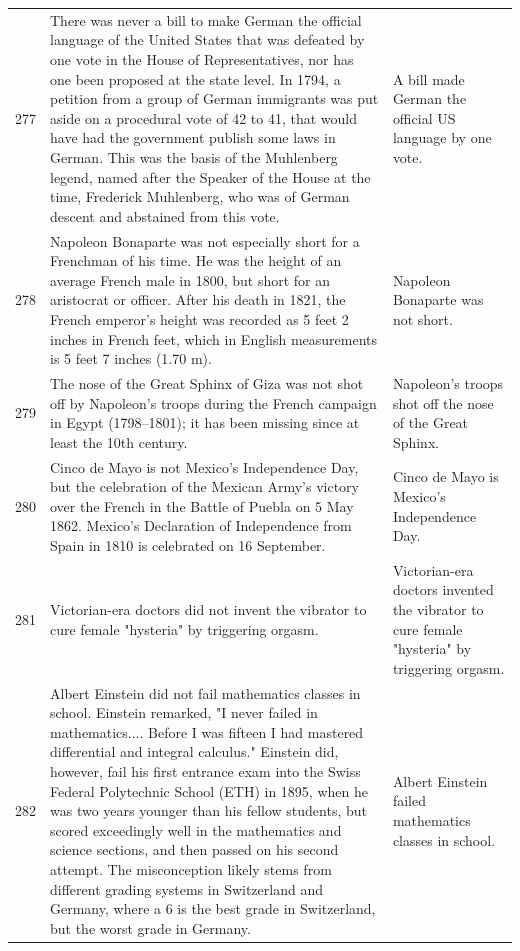 \begin{tabular}{c|p{}|p{}}
277 & There was never a bill to make German the official language of the United States that was defeated by one vote in the House of Representatives, nor has one been proposed at the state level. In 1794, a petition from a group of German immigrants was put aside on a procedural vote of 42 to 41, that would have had the government publish some laws in German. This was the basis of the Muhlenberg legend, named after the Speaker of the House at the time, Frederick Muhlenberg, who was of German descent and abstained from this vote. & A bill made German the official US language by one vote. \\
278 & Napoleon Bonaparte was not especially short for a Frenchman of his time. He was the height of an average French male in 1800, but short for an aristocrat or officer. After his death in 1821, the French emperor's height was recorded as 5 feet 2 inches in French feet, which in English measurements is 5 feet 7 inches (1.70 m). & Napoleon Bonaparte was not short. \\
279 & The nose of the Great Sphinx of Giza was not shot off by Napoleon's troops during the French campaign in Egypt (1798–1801); it has been missing since at least the 10th century. & Napoleon's troops shot off the nose of the Great Sphinx. \\
280 & Cinco de Mayo is not Mexico's Independence Day, but the celebration of the Mexican Army's victory over the French in the Battle of Puebla on 5 May 1862. Mexico's Declaration of Independence from Spain in 1810 is celebrated on 16 September. & Cinco de Mayo is Mexico's Independence Day. \\
281 & Victorian-era doctors did not invent the vibrator to cure female "hysteria" by triggering orgasm. & Victorian-era doctors invented the vibrator to cure female "hysteria" by triggering orgasm. \\
282 & Albert Einstein did not fail mathematics classes in school. Einstein remarked, "I never failed in mathematics.... Before I was fifteen I had mastered differential and integral calculus." Einstein did, however, fail his first entrance exam into the Swiss Federal Polytechnic School (ETH) in 1895, when he was two years younger than his fellow students, but scored exceedingly well in the mathematics and science sections, and then passed on his second attempt. The misconception likely stems from different grading systems in Switzerland and Germany, where a 6 is the best grade in Switzerland, but the worst grade in Germany. & Albert Einstein failed mathematics classes in school. \\

\end{tabular}
